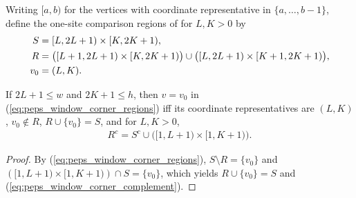 \begin{definition}%
    \label{def:peps_window_corner_regions}
    \leanok
    Writing ${\lbrack a,b)}$ for the vertices with coordinate representative in
    $\{a,\ldots,b-1\}$, define the one-site comparison regions of
    \cite[proof of Theorem~3]{Molnar2018NormalPEPS} for $L,K>0$ by
    \begin{align}
        S   & ={\lbrack L,2L+1)}\times{\lbrack K,2K+1)},\notag            \\
        R   & =\bigl({\lbrack L+1,2L+1)}\times{\lbrack K,2K+1)}\bigr)
        \cup\bigl({\lbrack L,2L+1)}\times{\lbrack K+1,2K+1)}\bigr),\notag \\
        v_0 & =(L,K).
        \label{eq:peps_window_corner_regions}
    \end{align}
\end{definition}

\begin{lemma}%
    \label{thm:peps_window_corner_geometry}
    \leanok
    If $2L+1\le w$ and $2K+1\le h$, then $v=v_0$ in
    (\ref{eq:peps_window_corner_regions}) iff its coordinate representatives
    are $(L,K)$, $v_0\notin R$, $R\cup\{v_0\}=S$, and for $L,K>0$,
    \begin{align}
        R^c=S^c\cup\bigl({\lbrack 1,L+1)}\times{\lbrack 1,K+1)}\bigr).
        \label{eq:peps_window_corner_complement}
    \end{align}
\end{lemma}
\begin{proof}\leanok
    By (\ref{eq:peps_window_corner_regions}), $S\setminus R=\{v_0\}$ and
    $({\lbrack 1,L+1)}\times{\lbrack 1,K+1)})\cap S=\{v_0\}$, which yields
    $R\cup\{v_0\}=S$ and (\ref{eq:peps_window_corner_complement}).
\end{proof}

